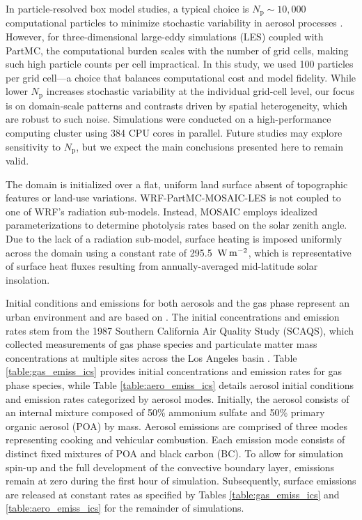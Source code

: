 \documentclass[acp, manuscript]{copernicus}
\begin{document}
In particle-resolved box model studies, a typical choice is
  $N_{\mathrm{p}} \sim 10{,}000$ computational particles to minimize
  stochastic variability in aerosol processes
  \citep{gmd-17-8399-2024, Liu_2025}.  However, for
  three-dimensional large-eddy simulations (LES) coupled with PartMC,
  the computational burden scales with the number of grid cells,
  making such high particle counts per cell impractical. In this
  study, we used 100 particles per grid cell—a choice that balances
  computational cost and model fidelity. While lower $N_{\mathrm{p}}$
  increases stochastic variability at the individual grid-cell level,
  our focus is on domain-scale patterns and contrasts driven by
  spatial heterogeneity, which are robust to such noise. Simulations
  were conducted on a high-performance computing cluster using 384 CPU
  cores in parallel. Future studies may explore sensitivity to
  $N_{\mathrm{p}}$, but we expect the main conclusions presented here
  to remain valid.

The domain is initialized over a flat, uniform land surface absent of
topographic features or land-use variations. WRF-PartMC-MOSAIC-LES is
not coupled to one of WRF's radiation sub-models. Instead, MOSAIC
employs idealized parameterizations to determine photolysis rates
based on the solar zenith angle. Due to the lack of a radiation
sub-model, surface heating is imposed uniformly across the domain
using a constant rate of 295.5~$\rm W \, m^{-2}$, which is
representative of surface heat fluxes resulting from annually-averaged mid-latitude solar insolation.

Initial conditions and emissions for both aerosols and the gas phase
represent an urban environment and are based on
\citet{riemer_simulating_2009}. The initial concentrations and
emission rates stem from the 1987 Southern California Air Quality
Study (SCAQS), which collected measurements of gas phase species and
particulate matter mass concentrations at multiple sites across the
Los Angeles basin \citep{zaveri_model_2008}. Table
\ref{table:gas_emiss_ics} provides initial concentrations and emission
rates for gas phase species, while Table \ref{table:aero_emiss_ics}
details aerosol initial conditions and emission rates categorized by
aerosol modes. Initially, the aerosol consists of an internal mixture
composed of 50\% ammonium sulfate and 50\% primary organic aerosol
(POA) by mass.  Aerosol emissions are comprised of three modes representing cooking and vehicular combustion. Each emission mode consists of distinct fixed mixtures of POA and black carbon (BC). To allow for simulation spin-up
and the full development of the convective boundary layer, emissions
remain at zero during the first hour of simulation. Subsequently,
surface emissions are released at constant rates as specified by
Tables \ref{table:gas_emiss_ics} and \ref{table:aero_emiss_ics} for
the remainder of simulations.
\end{document}
